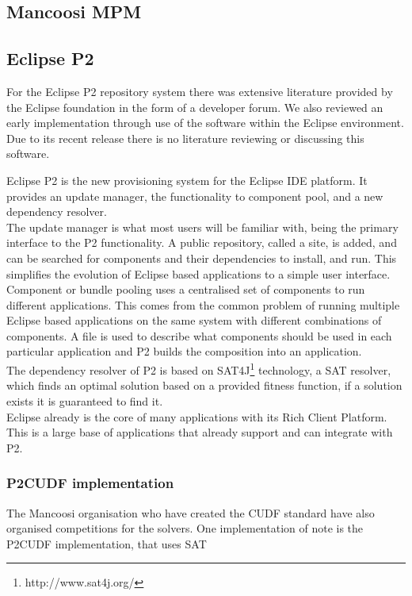 \subsection{Mancoosi MPM}

\subsection{Eclipse P2}

For the Eclipse P2 repository system there was extensive literature provided by the Eclipse foundation in the form of a developer forum.
We also reviewed an early implementation through use of the software within the Eclipse environment.
Due to its recent release there is no literature reviewing or discussing this software.

Eclipse P2
is the new provisioning system for the Eclipse IDE platform.
It provides an update manager, the functionality to component pool, and a new dependency resolver.\\
The update manager is what most users will be familiar with, being the primary interface to the P2 functionality. 
A public repository, called a site, is added, and can be searched for components and their dependencies to install, and run.
This simplifies the evolution of Eclipse based applications to a simple user interface.\\
Component or bundle pooling uses a centralised set of components to run different applications.
This comes from the common problem of running multiple Eclipse based applications on the same system with different combinations of components.
A file is used to describe what components should be used in each particular application and P2 builds the composition into an application.\\
The dependency resolver of P2 is based on SAT4J\footnote{http://www.sat4j.org/} technology, a SAT resolver, which finds an optimal solution based on
a provided fitness function, if a solution exists it is guaranteed to find it.\\  
Eclipse already is
the core of many applications with its Rich Client Platform. This is a large base of applications that already support and can integrate with P2.

\subsubsection{P2CUDF implementation}
The Mancoosi organisation who have created the CUDF standard have also organised competitions for the solvers.
One implementation of note is the P2CUDF implementation, that uses SAT


